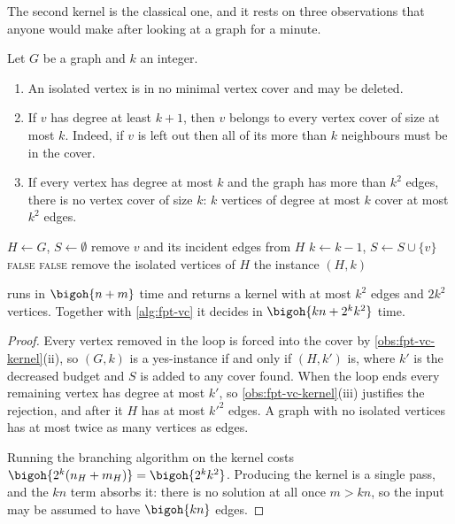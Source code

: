 The second kernel is the classical one, and it rests on three observations that
anyone would make after looking at a graph for a minute.

\begin{observation}\label{obs:fpt-vc-kernel}
Let $G$ be a graph and $k$ an integer.
\begin{enumerate}[label=(\roman*),leftmargin=*]
  \item An isolated vertex is in no minimal vertex cover and may be deleted.
  \item If $v$ has degree at least $k+1$, then $v$ belongs to every vertex cover
        of size at most $k$. Indeed, if $v$ is left out then all of its more
        than $k$ neighbours must be in the cover.
  \item If every vertex has degree at most $k$ and the graph has more than $k^2$
        edges, there is no vertex cover of size $k$: $k$ vertices of degree at
        most $k$ cover at most $k^2$ edges.
\end{enumerate}
\end{observation}

\begin{algorithm}[ht]
\caption{Kernelisation for  }
\label{alg:fpt-vc-kernel}
\begin{algorithmic}[1]
  \State $H \gets G$, \quad $S \gets \emptyset$
    \State remove $v$ and its incident edges from $H$
    \State $k \gets k-1$, \quad $S \gets S \cup \{v\}$
  \EndWhile
   \Return \textsc{false} \EndIf
   \Return \textsc{false} \EndIf
  \State remove the isolated vertices of $H$
  \State \Return the instance $(H,k)$
\end{algorithmic}
\end{algorithm}

\begin{theorem}\label{thm:fpt-vc-kernel}
 runs in $\bigoh{n+m}$ time and returns a kernel with at
most $k^2$ edges and $2k^2$ vertices. Together with \cref{alg:fpt-vc} it decides
 in $\bigoh{kn + 2^kk^2}$ time.
\end{theorem}

\begin{proof}
Every vertex removed in the loop is forced into the cover by
\cref{obs:fpt-vc-kernel}(ii), so $(G,k)$ is a yes-instance if and only if
$(H,k')$ is, where $k'$ is the decreased budget and $S$ is added to any cover
found. When the loop ends every remaining vertex has degree at most $k'$, so
\cref{obs:fpt-vc-kernel}(iii) justifies the rejection, and after it $H$ has at
most $k'^2$ edges. A graph with no isolated vertices has at most twice as many
vertices as edges.

Running the branching algorithm on the kernel costs
$\bigoh{2^{k}(n_H + m_H)} = \bigoh{2^kk^2}$. Producing the kernel is a single
pass, and the $kn$ term absorbs it: there is no solution at all once
$m > kn$, so the input may be assumed to have $\bigoh{kn}$ edges.
\end{proof}

